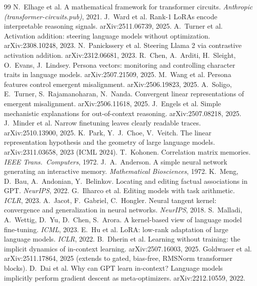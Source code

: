 \documentclass[11pt]{article}
\begin{document}
\begin{thebibliography}{99}\footnotesize
{} N.~Elhage et al. A mathematical framework for transformer circuits. \emph{Anthropic (transformer-circuits.pub)}, 2021.
 J.~Ward et al. Rank-1 LoRAs encode interpretable reasoning signals. arXiv:2511.06739, 2025.
 A.~Turner et al. Activation addition: steering language models without optimization. arXiv:2308.10248, 2023.
 N.~Panickssery et al. Steering Llama 2 via contrastive activation addition. arXiv:2312.06681, 2023.
 R.~Chen, A.~Arditi, H.~Sleight, O.~Evans, J.~Lindsey. Persona vectors: monitoring and controlling character traits in language models. arXiv:2507.21509, 2025.
 M.~Wang et al. Persona features control emergent misalignment. arXiv:2506.19823, 2025.
 A.~Soligo, E.~Turner, S.~Rajamanoharan, N.~Nanda. Convergent linear representations of emergent misalignment. arXiv:2506.11618, 2025.
 J.~Engels et al. Simple mechanistic explanations for out-of-context reasoning. arXiv:2507.08218, 2025.
 J.~Minder et al. Narrow finetuning leaves clearly readable traces. arXiv:2510.13900, 2025.
 K.~Park, Y.~J.~Choe, V.~Veitch. The linear representation hypothesis and the geometry of large language models. arXiv:2311.03658, 2023 (ICML 2024).
 T.~Kohonen. Correlation matrix memories. \emph{IEEE Trans.\ Computers}, 1972.
 J.~A.~Anderson. A simple neural network generating an interactive memory. \emph{Mathematical Biosciences}, 1972.
 K.~Meng, D.~Bau, A.~Andonian, Y.~Belinkov. Locating and editing factual associations in GPT. \emph{NeurIPS}, 2022.
 G.~Ilharco et al. Editing models with task arithmetic. \emph{ICLR}, 2023.
 A.~Jacot, F.~Gabriel, C.~Hongler. Neural tangent kernel: convergence and generalization in neural networks. \emph{NeurIPS}, 2018.
 S.~Malladi, A.~Wettig, D.~Yu, D.~Chen, S.~Arora. A kernel-based view of language model fine-tuning. \emph{ICML}, 2023.
 E.~Hu et al. LoRA: low-rank adaptation of large language models. \emph{ICLR}, 2022.
 B.~Dherin et al. Learning without training: the implicit dynamics of in-context learning. arXiv:2507.16003, 2025.
 Goldwaser et al. arXiv:2511.17864, 2025 (extends \cite{dherin2025} to gated, bias-free, RMSNorm transformer blocks).
 D.~Dai et al. Why can GPT learn in-context? Language models implicitly perform gradient descent as meta-optimizers. arXiv:2212.10559, 2022.

\end{thebibliography}
\end{document}
